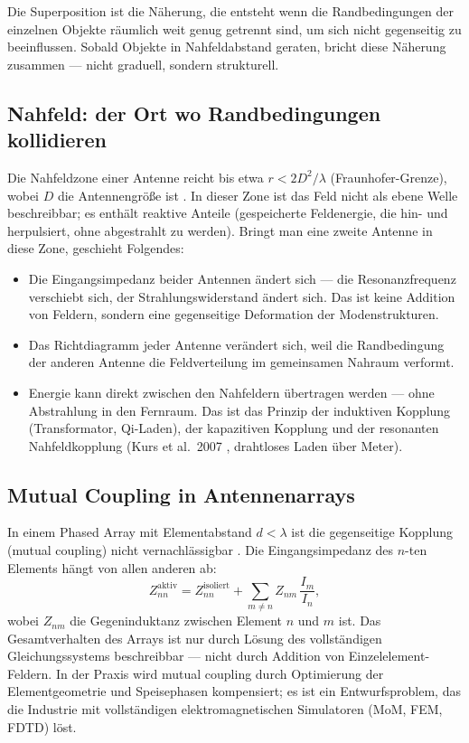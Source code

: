 Die Superposition ist die Näherung, die entsteht wenn die Randbedingungen
der einzelnen Objekte räumlich weit genug getrennt sind, um sich nicht
gegenseitig zu beeinflussen. Sobald Objekte in Nahfeldabstand geraten,
bricht diese Näherung zusammen --- nicht graduell, sondern strukturell.

\subsection*{Nahfeld: der Ort wo Randbedingungen kollidieren}

Die Nahfeldzone einer Antenne reicht bis etwa $r < 2D^2/\lambda$
(Fraunhofer-Grenze), wobei $D$ die Antennengröße ist \EM. In dieser Zone
ist das Feld nicht als ebene Welle beschreibbar; es enthält reaktive
Anteile (gespeicherte Feldenergie, die hin- und herpulsiert, ohne
abgestrahlt zu werden). Bringt man eine zweite Antenne in diese Zone,
geschieht Folgendes:

\begin{itemize}[nosep]
\item Die Eingangsimpedanz beider Antennen ändert sich --- die
  Resonanzfrequenz verschiebt sich, der Strahlungswiderstand ändert
  sich. Das ist keine Addition von Feldern, sondern eine gegenseitige
  Deformation der Modenstrukturen.
\item Das Richtdiagramm jeder Antenne verändert sich, weil die
  Randbedingung der anderen Antenne die Feldverteilung im gemeinsamen
  Nahraum verformt.
\item Energie kann direkt zwischen den Nahfeldern übertragen werden
  --- ohne Abstrahlung in den Fernraum. Das ist das Prinzip der
  induktiven Kopplung (Transformator, Qi-Laden), der kapazitiven
  Kopplung und der resonanten Nahfeldkopplung (Kurs et al.\ 2007 \cite{Kurs2007},
  drahtloses Laden über Meter).
\end{itemize}

\subsection*{Mutual Coupling in Antennenarrays}

In einem Phased Array mit Elementabstand $d < \lambda$ ist die gegenseitige
Kopplung (mutual coupling) nicht vernachlässigbar \cite{Mailloux2017,Pozar2012}. Die Eingangsimpedanz
des $n$-ten Elements hängt von allen anderen ab:
\[
  Z_{nn}^{\mathrm{aktiv}} = Z_{nn}^{\mathrm{isoliert}}
  + \sum_{m \neq n} Z_{nm}\,\frac{I_m}{I_n},
\]
wobei $Z_{nm}$ die Gegeninduktanz zwischen Element $n$ und $m$ ist.
Das Gesamtverhalten des Arrays ist nur durch Lösung des vollständigen
Gleichungssystems beschreibbar --- nicht durch Addition von
Einzelelement-Feldern. In der Praxis wird mutual coupling durch
Optimierung der Elementgeometrie und Speisephasen kompensiert; es
ist ein Entwurfsproblem, das die Industrie mit vollständigen
elektromagnetischen Simulatoren (MoM, FEM, FDTD) löst.

